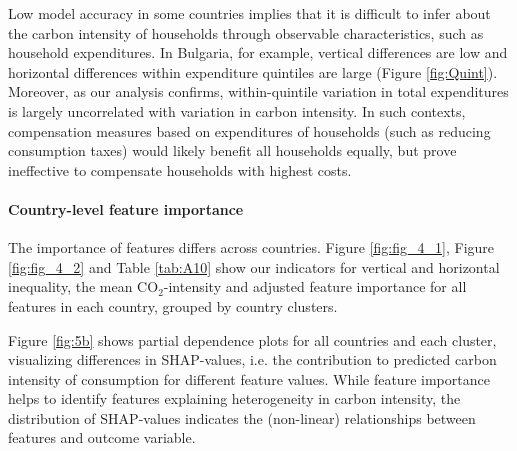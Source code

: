 \documentclass[12pt, a4paper]{article}
\begin{document}
Low model accuracy in some countries implies that it is difficult to infer about the carbon intensity of households through observable characteristics, such as household expenditures. In Bulgaria, for example, vertical differences are low and horizontal differences within expenditure quintiles are large (Figure \ref{fig:Quint}). Moreover, as our analysis confirms, within-quintile variation in total expenditures is largely uncorrelated with variation in carbon intensity. In such contexts, compensation measures based on expenditures of households (such as reducing consumption taxes) would likely benefit all households equally, but prove ineffective to compensate households with highest costs.

\paragraph{Country-level feature importance}

The importance of features differs across countries. Figure \ref{fig:fig_4_1}, Figure \ref{fig:fig_4_2} and Table \ref{tab:A10} show our indicators for vertical and horizontal inequality, the mean CO$_{2}$-intensity and adjusted feature importance for all features in each country, grouped by country clusters. %

Figure \ref{fig:5b} shows partial dependence plots for all countries and each cluster, visualizing differences in SHAP-values, i.e. the contribution to predicted carbon intensity of consumption for different feature values. While feature importance helps to identify features explaining heterogeneity in carbon intensity, the distribution of SHAP-values indicates the (non-linear) relationships between features and outcome variable.
\end{document}
